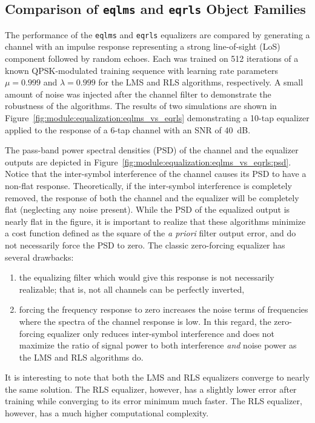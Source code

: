 \subsection{Comparison of {\tt eqlms} and {\tt eqrls} Object Families}
\label{module:equalization:eqlms_vs_eqrls}
The performance of the {\tt eqlms} and {\tt eqrls} equalizers are compared by
generating a channel with an impulse response representing a strong
line-of-sight (LoS) component followed by random echoes.
Each was trained on 512 iterations of a known QPSK-modulated training sequence
with learning rate parameters $\mu=0.999$ and $\lambda=0.999$ for the LMS and
RLS algorithms, respectively.
A small amount of noise was injected after the channel filter to demonstrate
the robustness of the algorithms.
The results of two simulations are shown in
Figure~\ref{fig:module:equalization:eqlms_vs_eqrls}
demonstrating a 10-tap equalizer applied to the response of a 6-tap
channel with an SNR of 40~dB.

The pass-band power spectral densities (PSD) of the channel and the equalizer
outputs are depicted in
Figure~\ref{fig:module:equalization:eqlms_vs_eqrls:psd}.
Notice that the inter-symbol interference of the channel causes its PSD to
have a non-flat response.
Theoretically, if the inter-symbol interference is completely removed, the
response of both the channel and the equalizer will be completely flat
(neglecting any noise present).
While the PSD of the equalized output is nearly flat in the figure,
it is important to realize that these algorithms minimize a cost function
defined as the square of the {\it a priori} filter output error, and do not
necessarily force the PSD to zero.
The classic zero-forcing equalizer has several drawbacks:
\begin{enumerate}
\item the equalizing filter which would give this response is not
      necessarily realizable; that is, not all channels can be
      perfectly inverted,
\item forcing the frequency response to zero increases the noise
      terms of frequencies where the spectra of the channel
      response is low.  In this regard, the zero-forcing equalizer
      only reduces inter-symbol interference and does not maximize
      the ratio of signal power to both interference {\it and}
      noise power as the LMS and RLS algorithms do.
\end{enumerate}
It is interesting to note that both the LMS and RLS equalizers converge to
nearly the same solution.
The RLS equalizer, however, has a slightly lower error after
training while converging to its error minimum much faster.
The RLS equalizer, however, has a much higher computational complexity.

